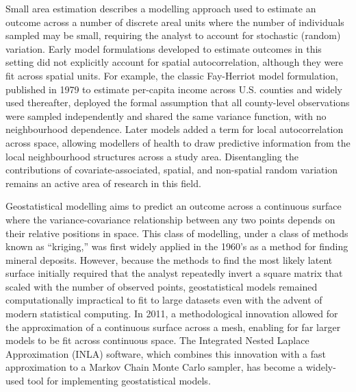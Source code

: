 \documentclass[
]{report}
\begin{document}
Small area estimation describes a modelling approach used to estimate an outcome across a number of discrete areal units where the number of individuals sampled may be small, requiring the analyst to account for stochastic (random) variation. Early model formulations developed to estimate outcomes in this setting did not explicitly account for spatial autocorrelation, although they were fit across spatial units. For example, the classic Fay-Herriot model formulation, published in 1979 to estimate per-capita income across U.S. counties and widely used thereafter, deployed the formal assumption that all county-level observations were sampled independently and shared the same variance function, with no neighbourhood dependence.\autocite{III1979a} Later models added a term for local autocorrelation across space, allowing modellers of health to draw predictive information from the local neighbourhood structures across a study area.\autocite{Besag1991} Disentangling the contributions of covariate-associated, spatial, and non-spatial random variation remains an active area of research in this field.\autocite{MacNab2011,Riebler2016}

Geostatistical modelling aims to predict an outcome across a continuous surface where the variance-covariance relationship between any two points depends on their relative positions in space. This class of modelling, under a class of methods known as ``kriging,'' was first widely applied in the 1960's as a method for finding mineral deposits.\autocite{Oliver2010} However, because the methods to find the most likely latent surface initially required that the analyst repeatedly invert a square matrix that scaled with the number of observed points, geostatistical models remained computationally impractical to fit to large datasets even with the advent of modern statistical computing. In 2011, a methodological innovation allowed for the approximation of a continuous surface across a mesh, enabling for far larger models to be fit across continuous space.\autocite{Lindgren2011,Miller2020} The Integrated Nested Laplace Approximation (INLA) software, which combines this innovation with a fast approximation to a Markov Chain Monte Carlo sampler, has become a widely-used tool for implementing geostatistical models.\autocite{Rue2009,Krainski2018}
\end{document}
